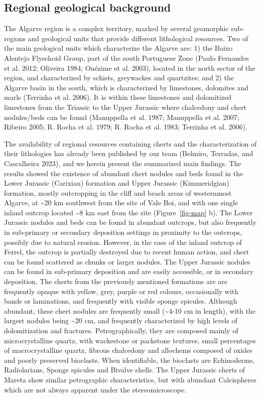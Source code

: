 \documentclass[
  a4paper,
  DIV=11,
  numbers=noendperiod]{scrreprt}
\begin{document}
\subsection{Regional geological
background}\label{regional-geological-background}

The Algarve region is a complex territory, marked by several geomorphic
sub-regions and geological units that provide different lithological
resources. Two of the main geological units which characterize the
Algarve are: 1) the Baixo Alentejo Flyschoid Group, part of the south
Portuguese Zone (Paulo Fernandes et al. 2012; Oliveira 1984; Onézime et
al. 2003), located in the north sector of the region, and characterized
by schists, greywackes and quartzites; and 2) the Algarve basin in the
south, which is characterized by limestones, dolomites and marls
(Terrinha et al. 2006). It is within these limestones and dolomitized
limestones from the Triassic to the Upper Jurassic where chalcedony and
chert nodules/beds can be found (Manuppella et al. 1987; Manuppella et
al. 2007; Ribeiro 2005; R. Rocha et al. 1979; R. Rocha et al. 1983;
Terrinha et al. 2006).

The availability of regional resources containing cherts and the
characterization of their lithologies has already been published by our
team (Belmiro, Terradas, and Cascalheira 2023), and we herein present
the summarized main findings. The results showed the existence of
abundant chert nodules and beds found in the Lower Jurassic (Carixian)
formation and Upper Jurassic (Kimmeridgian) formation, mostly
outcropping in the cliff and beach areas of westernmost Algarve, at
\textasciitilde20 km southwest from the site of Vale Boi, and with one
single inland outcrop located \textasciitilde8 km east from the site
(Figure~\ref{fig-map} b). The Lower Jurassic nodules and beds can be
found in abundant outcrops, but also frequently in sub-primary or
secondary deposition settings in proximity to the outcrops, possibly due
to natural erosion. However, in the case of the inland outcrop of
Ferrel, the outcrop is partially destroyed due to recent human action,
and chert can be found scattered as chunks or larger nodules. The Upper
Jurassic nodules can be found in sub-primary deposition and are easily
accessible, or in secondary deposition. The cherts from the previously
mentioned formations are are frequently opaque with yellow, grey, purple
or red colours, occasionally with bands or laminations, and frequently
with visible sponge spicules. Although abundant, these chert nodules are
frequently small (\textasciitilde4-10 cm in length), with the largest
nodules being \textasciitilde20 cm, and frequently characterized by high
levels of dolomitization and fractures. Petrographically, they are
composed mainly of microcrystalline quartz, with wackestone or packstone
textures, small percentages of macrocrystalline quartz, fibrous
chalcedony and allochems composed of oxides and poorly preserved
bioclasts. When identifiable, the bioclasts are Echinoderms,
Radiolarians, Sponge spicules and Bivalve shells. The Upper Jurassic
cherts of Mareta show similar petrographic characteristics, but with
abundant Calcispheres which are not always apparent under the
stereomicroscope.
\end{document}
